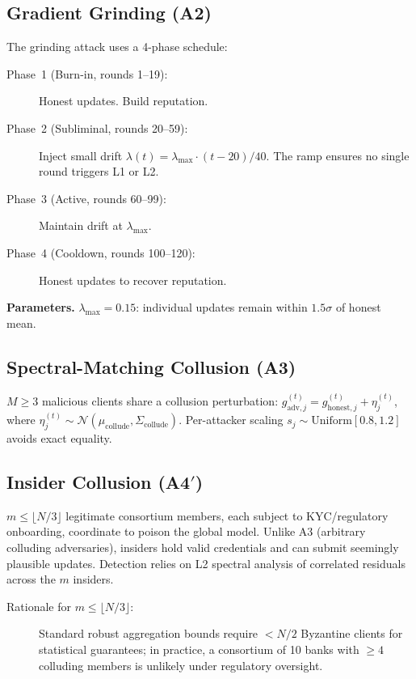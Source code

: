 \documentclass[10pt,journal]{IEEEtran}
\begin{document}
\subsection{Gradient Grinding (A2)}
\label{sec:attack-grinding}

The grinding attack uses a 4-phase schedule:

\begin{description}
  \item[Phase~1 (Burn-in, rounds 1--19):] Honest updates. Build reputation.
  \item[Phase~2 (Subliminal, rounds 20--59):] Inject small drift $\lambda(t) = \lambda_{\text{max}} \cdot (t-20)/40$. The ramp ensures no single round triggers L1 or L2.
  \item[Phase~3 (Active, rounds 60--99):] Maintain drift at $\lambda_{\text{max}}$.
  \item[Phase~4 (Cooldown, rounds 100--120):] Honest updates to recover reputation.
\end{description}

\textbf{Parameters.} $\lambda_{\text{max}} = 0.15$: individual updates remain within $1.5\sigma$ of honest mean.

\subsection{Spectral-Matching Collusion (A3)}

$M \ge 3$ malicious clients share a collusion perturbation: $g_{\text{adv},j}^{(t)} = g_{\text{honest},j}^{(t)} + \eta_j^{(t)}$, where $\eta_j^{(t)} \sim \mathcal{N}(\mu_{\text{collude}}, \Sigma_{\text{collude}})$. Per-attacker scaling $s_j \sim \text{Uniform}[0.8,1.2]$ avoids exact equality.

\subsection{Insider Collusion (A4$'$)}\label{sec:attack-insider}

$m \le \lfloor N/3\rfloor$ legitimate consortium members, each subject to KYC/regulatory onboarding, coordinate to poison the global model. Unlike A3 (arbitrary colluding adversaries), insiders hold valid credentials and can submit seemingly plausible updates. Detection relies on L2 spectral analysis of correlated residuals across the $m$ insiders.

\begin{description}
  \item[Rationale for $m \le \lfloor N/3\rfloor$:] Standard robust aggregation bounds require $< N/2$ Byzantine clients for statistical guarantees; in practice, a consortium of 10 banks with $\ge 4$ colluding members is unlikely under regulatory oversight.
\end{description}
\end{document}
